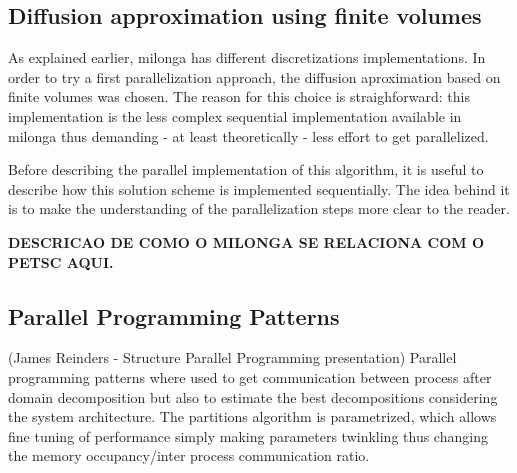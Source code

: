 \documentclass{anstrans}
\renewcommand{\vec}[1]{\bm{#1}} %
\newcommand{\vd}{\bm{\cdot}} %
\newcommand{\grad}{\vec{\nabla}} %
\newcommand{\ud}{\mathop{}\!\mathrm{d}} %
\begin{document}
\subsection{Diffusion approximation using finite volumes}

As explained earlier, milonga has different discretizations implementations. 
In order to try a first parallelization approach, the diffusion aproximation 
based on finite volumes was chosen. The reason for this choice is straighforward: 
this implementation is the less complex sequential implementation available in milonga thus demanding - at least theoretically - less effort to get parallelized.

Before describing the parallel implementation of this algorithm, it is useful to 
describe how this solution scheme is implemented sequentially. The idea behind it 
is to make the understanding of the parallelization steps more clear to the reader.

\textbf{DESCRICAO DE COMO O MILONGA SE RELACIONA COM O PETSC AQUI.}

\subsection{Parallel Programming Patterns}
(James Reinders - Structure Parallel Programming presentation)
Parallel programming patterns where used to get communication between process after
domain decomposition but also to estimate the best decompositions considering the system
architecture. The partitions algorithm is parametrized, which allows fine tuning of performance
simply making parameters twinkling thus changing the memory occupancy/inter process communication ratio.



\end{document}
